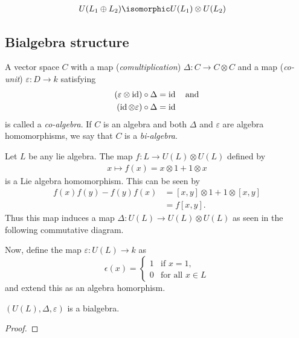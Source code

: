 \begin{align}
    U(L_1\oplus L_2) &\isomorphic U(L_1) \otimes U(L_2)
\end{align}

\subsection{Bialgebra structure}
\label{sub:bialgebra_structure}
\begin{definition}[Bialgebra]
A vector space $C$ with a map (\emph{comultiplication}) $\Delta: C\to C\otimes C$ and a map (\emph{co-unit}) $\varepsilon: D\to k$ satisfying
\begin{align}
    (\varepsilon\otimes \operatorname{id}) \circ \Delta &= \operatorname{id} \quad\text{and} \\
    (\operatorname{id}\otimes \varepsilon) \circ \Delta &= \operatorname{id}
\end{align}
is called a \emph{co-algebra}. If $C$ is an algebra and both $\Delta$ and $\varepsilon$ are algebra homomorphisms, we say that $C$ is a \emph{bi-algebra}.
    
\end{definition}

Let $L$ be any lie algebra. The map $f: L\to U(L)\otimes U(L)$ defined by
\begin{align}
    x\mapsto f(x)=x\otimes 1 + 1\otimes x
\end{align}
is a Lie algebra homomorphism. This can be seen by
\begin{align}
    f(x)f(y)- f(y)f(x) &= [x,y]\otimes 1 + 1\otimes [x,y]\\
        &= f[x,y].
\end{align}
Thus this map induces a map $\Delta: U(L)\to U(L)\otimes U(L)$ as seen in the following commutative diagram.
\begin{center}
\end{center}
Now, define the map $\varepsilon: U(L)\to k$ as
\begin{equation}
    \epsilon(x) = \begin{cases} 
        1 &\text{if } x=1,\\
        0 &\text{for all } x\in L
    \end{cases}
\end{equation}
and extend this as an algebra homorphism.
\begin{proposition}
   $(U(L), \Delta, \varepsilon)$  is a bialgebra.
\end{proposition}
\begin{proof}
\end{proof}

